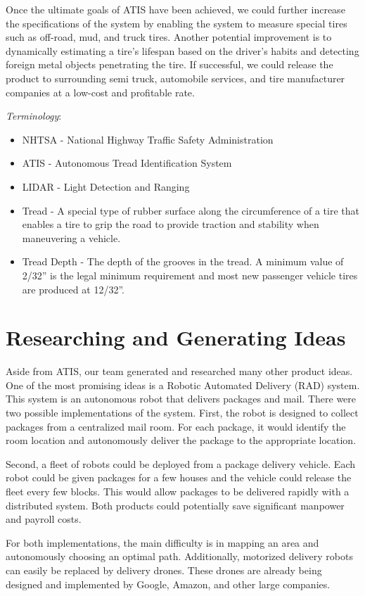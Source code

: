 \documentclass[11pt]{IEEEtran}
\begin{document}
			Once the ultimate goals of ATIS have been achieved, we could further increase the specifications of the system by enabling the system to measure special tires such as off-road, mud, and truck tires. Another potential improvement is to dynamically estimating a tire’s lifespan based on the driver’s habits and detecting foreign metal objects penetrating the tire. If successful, we could release the product to surrounding semi truck, automobile services, and tire manufacturer companies at a low-cost and profitable rate.

		\textit{Terminology}:
		\begin{itemize}
			\item NHTSA - National Highway Traffic Safety Administration
			\item ATIS - Autonomous Tread Identification System
			\item LIDAR - Light Detection and Ranging 
			\item Tread - A special type of rubber surface along the circumference of a tire that enables a tire to grip the road to provide traction and stability when maneuvering a vehicle.
			\item Tread Depth - The depth of the grooves in the tread. A minimum value of 2/32'' is the legal minimum requirement and most new passenger vehicle tires are produced at 12/32''.
		\end{itemize}


	\section{Researching and Generating Ideas}
		Aside from ATIS, our team generated and researched many other product ideas. One of the most promising ideas is a Robotic Automated Delivery (RAD) system. This system is an autonomous robot that delivers packages and mail. There were two possible implementations of the system. First, the robot is designed to collect packages from a centralized mail room. For each package, it would identify the room location and autonomously deliver the package to the appropriate location.

		Second, a fleet of robots could be deployed from a package delivery vehicle. Each robot could be given packages for a few houses and the vehicle could release the fleet every few blocks. This would allow packages to be delivered rapidly with a distributed system. Both products could potentially save significant manpower and payroll costs.

		For both implementations, the main difficulty is in mapping an area and autonomously choosing an optimal path. Additionally, motorized delivery robots can easily be replaced by delivery drones. These drones are already being designed and implemented by Google, Amazon, and other large companies. 
\end{document}
